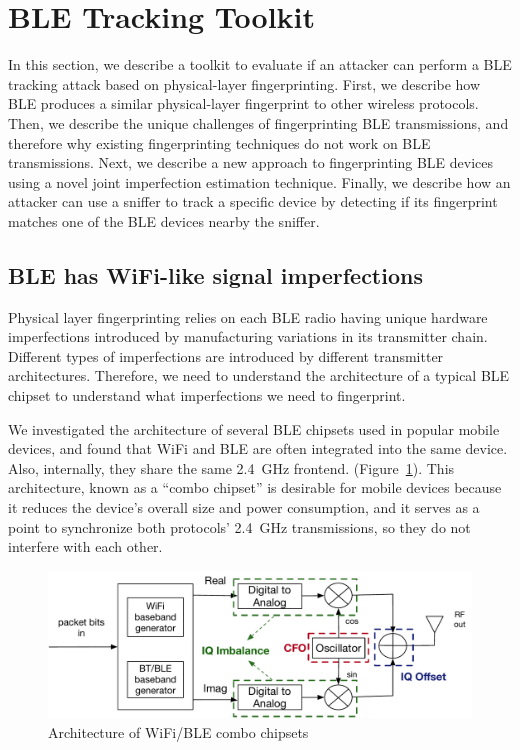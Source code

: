 
\section{BLE Tracking Toolkit}
\label{sec:methodology}

In this section, we describe a toolkit to evaluate if an attacker can perform a
BLE tracking attack based on physical-layer fingerprinting. First, we describe
how BLE produces a similar physical-layer fingerprint to other wireless
protocols. Then, we describe the unique challenges of fingerprinting BLE
transmissions, and therefore why existing fingerprinting techniques do not work on BLE
transmissions. Next, we describe a new approach to fingerprinting BLE devices
using a novel joint imperfection estimation technique. Finally, we describe how
an attacker can use a sniffer to track a specific device by detecting if its
fingerprint matches one of the BLE devices nearby the sniffer.

\subsection{BLE has WiFi-like signal imperfections}


Physical layer fingerprinting relies on each BLE radio having unique hardware
imperfections introduced by manufacturing variations in its transmitter chain.
Different types of imperfections are introduced by different transmitter
architectures. Therefore, we need to understand the architecture of a typical BLE
chipset to understand what imperfections we need to fingerprint.

We investigated the architecture of several BLE chipsets used in popular mobile
devices, and found that WiFi and BLE are often integrated into the same device.
Also, internally, they share the same 2.4~GHz \iq frontend.
(Figure~\ref{fig:iq_arch}). This architecture, known as a ``combo chipset'' is
desirable for mobile devices because it reduces the device's overall size and
power consumption, and it serves as a point to synchronize both protocols'
2.4~GHz transmissions, so they do not interfere with each other.

\begin{figure}
    \centering
    \includegraphics[width = \linewidth]{bletracking/plots/IQchain.pdf} 
    \caption{Architecture of WiFi/BLE combo chipsets}
    \label{fig:iq_arch}
\end{figure}

